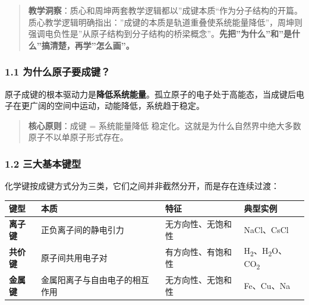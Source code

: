 \begin{quote}
\textbf{教学洞察}：质心和周坤两套教学逻辑都以''成键本质``作为分子结构的开篇。质心教学逻辑明确指出：''成键的本质是轨道重叠使系统能量降低''，周坤则强调电负性是''从原子结构到分子结构的桥梁概念''。\textbf{先把''为什么''和''是什么''搞清楚，再学''怎么画''。}
\end{quote}

\subsubsection{1.1 为什么原子要成键？}\label{ux4e3aux4ec0ux4e48ux539fux5b50ux8981ux6210ux952e}

原子成键的根本驱动力是\textbf{降低系统能量}。孤立原子的电子处于高能态，当成键后电子在更广阔的空间中运动，动能降低，系统趋于稳定。

\begin{quote}
\textbf{核心原则}：成键 = 系统能量降低 \箭 稳定化。这就是为什么自然界中绝大多数原子不以单原子形式存在。
\end{quote}

\subsubsection{1.2 三大基本键型}\label{ux4e09ux5927ux57faux672cux952eux578b}

化学键按成键方式分为三类，它们之间并非截然分开，而是存在连续过渡：

{\def\LTcaptype{none} %
\begin{longtable}[]{@{}
  >{\raggedright\arraybackslash}p{}
  >{\raggedright\arraybackslash}p{}
  >{\raggedright\arraybackslash}p{}
  >{\raggedright\arraybackslash}p{}@{}}
\toprule\noalign{}
\begin{minipage}[b]{\linewidth}\raggedright
键型
\end{minipage} & \begin{minipage}[b]{\linewidth}\raggedright
本质
\end{minipage} & \begin{minipage}[b]{\linewidth}\raggedright
特征
\end{minipage} & \begin{minipage}[b]{\linewidth}\raggedright
典型实例
\end{minipage} \\
\midrule\noalign{}
\endhead
\bottomrule\noalign{}
\endlastfoot
\textbf{离子键} & 正负离子间的静电引力 & 无方向性、无饱和性 & NaCl、CsCl \\
\textbf{共价键} & 原子间共用电子对 & 有方向性、有饱和性 & H\textsubscript{2}、H\textsubscript{2}O、CO\textsubscript{2} \\
\textbf{金属键} & 金属阳离子与自由电子的相互作用 & 无方向性、无饱和性 & Fe、Cu、Na \\
\end{longtable}
}

